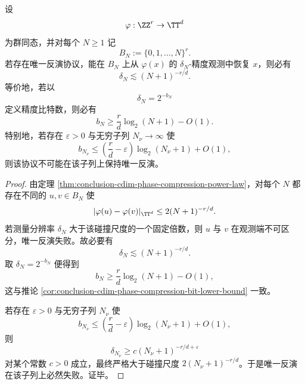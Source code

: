 \begin{theorem}[相位压缩的强逆阈值律]\label{thm:conclusion-phase-compression-strong-converse-threshold}
设
\[
\varphi:\ZZ^r\to \TT^d
\]
为群同态，并对每个 \(N\ge 1\) 记
\[
B_N:=\{0,1,\dots,N\}^r.
\]
若存在唯一反演协议，能在 \(B_N\) 上从 \(\varphi(x)\) 的 \(\delta_N\)-精度观测中恢复 \(x\)，则必有
\[
\delta_N\lesssim (N+1)^{-r/d}.
\]
等价地，若以
\[
\delta_N=2^{-b_N}
\]
定义精度比特数，则必有
\[
b_N\ge \frac{r}{d}\log_2(N+1)-O(1).
\]
特别地，若存在 \(\varepsilon>0\) 与无穷子列 \(N_\nu\to\infty\) 使
\[
b_{N_\nu}\le \left(\frac{r}{d}-\varepsilon\right)\log_2(N_\nu+1)+O(1),
\]
则该协议不可能在该子列上保持唯一反演。
\end{theorem}
\begin{proof}
由定理 \ref{thm:conclusion-cdim-phase-compression-power-law}，对每个 \(N\) 都存在不同的 \(u,v\in B_N\) 使
\[
|\varphi(u)-\varphi(v)|_{\TT^d}\le 2(N+1)^{-r/d}.
\]
若测量分辨率 \(\delta_N\) 大于该碰撞尺度的一个固定倍数，则 \(u\) 与 \(v\) 在观测端不可区分，唯一反演失败。故必要有
\[
\delta_N\lesssim (N+1)^{-r/d}.
\]
取 \(\delta_N=2^{-b_N}\) 便得到
\[
b_N\ge \frac{r}{d}\log_2(N+1)-O(1),
\]
这与推论 \ref{cor:conclusion-cdim-phase-compression-bit-lower-bound} 一致。

若存在 \(\varepsilon>0\) 与无穷子列 \(N_\nu\) 使
\[
b_{N_\nu}\le \left(\frac{r}{d}-\varepsilon\right)\log_2(N_\nu+1)+O(1),
\]
则
\[
\delta_{N_\nu}\ge c(N_\nu+1)^{-r/d+\varepsilon}
\]
对某个常数 \(c>0\) 成立，最终严格大于碰撞尺度 \(2(N_\nu+1)^{-r/d}\)。于是唯一反演在该子列上必然失败。证毕。
\end{proof}

